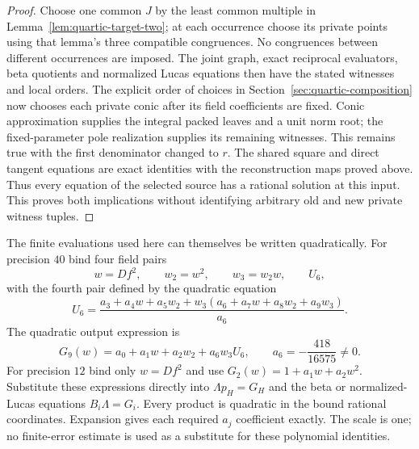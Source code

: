 \documentclass[11pt]{article}
\theoremstyle{definition}
\theoremstyle{remark}
\begin{document}
\begin{proof}
Choose one common $J$ by the least common multiple in
Lemma~\ref{lem:quartic-target-two}; at each occurrence choose its private
points using that lemma's three compatible congruences. No congruences
between different occurrences are imposed. The joint graph, exact
reciprocal evaluators, beta quotients and normalized Lucas equations then
have the stated witnesses and local orders. The explicit order of choices
in Section~\ref{sec:quartic-composition} now chooses each private conic
after its field coefficients are fixed. Conic approximation supplies the
integral packed leaves and a unit norm root; the fixed-parameter pole
realization supplies its remaining witnesses. This remains true with the
first denominator changed to $r$. The shared square and direct tangent
equations are exact identities with the reconstruction maps proved above.
Thus every equation of the selected source has a rational solution at
this input. This proves both implications without identifying arbitrary
old and new private witness tuples.
\end{proof}

The finite evaluations used here can themselves be written quadratically.
For precision $40$ bind four field pairs
\[
 w=Df^2,\qquad w_2=w^2,\qquad w_3=w_2w,\qquad U_6,
\]
with the fourth pair defined by the quadratic equation
\[
 U_6=\frac{a_3+a_4w+a_5w_2+
                  w_3(a_6+a_7w+a_8w_2+a_9w_3)}{a_6}.
\]
The quadratic output expression is
\[
 G_9(w)=a_0+a_1w+a_2w_2+a_6w_3U_6,
 \qquad a_6=-\frac{418}{16575}\ne0.
\]
For precision $12$ bind only $w=Df^2$ and use
$G_2(w)=1+a_1w+a_2w^2$. Substitute these expressions directly into
$\Lambda p_H=G_H$ and the beta or normalized-Lucas equations $B_i\Lambda=G_i$. Every product is quadratic in
the bound rational coordinates. Expansion gives each required $a_j$
coefficient exactly. The scale is one; no finite-error estimate is used
as a substitute for these polynomial identities.
\end{document}
